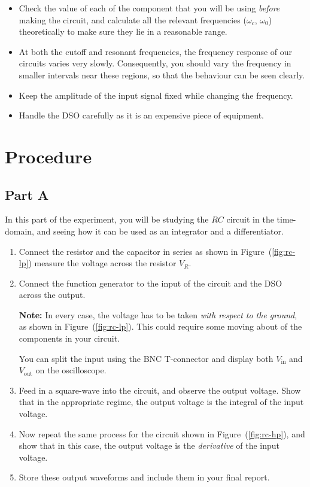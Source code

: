 \begin{itemize}
\item Check the value of each of the component that you will be using \textsl{before} making the circuit, and calculate all the relevant frequencies ($\omega_c$, $\omega_0$) theoretically to make sure they lie in a reasonable range.
\item At both the cutoff and resonant frequencies, the frequency response of our circuits varies very slowly. Consequently, you should vary the frequency in smaller intervals near these regions, so that the behaviour can be seen clearly.
\item Keep the amplitude of the input signal fixed while changing the frequency.
\item Handle the DSO carefully as it is an expensive piece of equipment.
\end{itemize}


\section*{Procedure}

\subsection*{Part A}

In this part of the experiment, you will be studying the $RC$ circuit in the time-domain, and seeing how it can be used as an integrator and a differentiator. 

\begin{enumerate}
    \item Connect the resistor and the capacitor in series as shown in Figure~(\ref{fig:rc-lp}) measure the voltage across the resistor $V_R$.
    \item Connect the function generator to the input of the circuit and the DSO across the output.
    \begin{imp}
        \textbf{Note:} In every case, the voltage has to be taken \textsl{with respect to the ground}, as shown in Figure~(\ref{fig:rc-lp}). This could require some moving about of the components in your circuit.
    \end{imp}

    You can split the input using the BNC T-connector and display both $V_\text{in}$ and $V_\text{out}$ on the oscilloscope.
    \item Feed in a square-wave into the circuit, and observe the output voltage. Show that in the appropriate regime, the output voltage is the integral of the input voltage.

    \item Now repeat the same process for the circuit shown in Figure~(\ref{fig:rc-hp}), and show that in this case, the output voltage is the \textsl{derivative} of the input voltage.

    \item Store these output waveforms and include them in your final report.
\end{enumerate}


